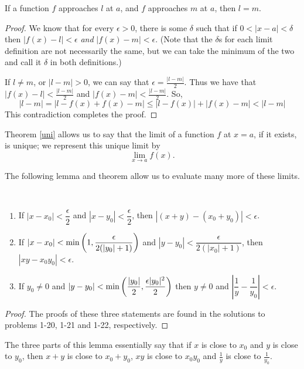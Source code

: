 \begin{theorem} \label{uni}
If a function $f$ approaches $l$ at $a$, and $f$ approaches $m$ at $a$, then $l = m$.
\begin{proof}
We know that for every $\epsilon > 0$, there is some $\delta$ such that if $0 < |x - a| < \delta$ then $|f(x) - l| < \epsilon$ \textit{and} $|f(x) - m| < \epsilon$. (Note that the $\delta$s for each limit definition are not necessarily the same, but we can take the minimum of the two and call it $\delta$ in both definitions.) 

If $l \ne m$, or $|l - m| > 0$, we can say that $\epsilon = \frac{|l - m|}{2}$. Thus we have that $|f(x) - l| < \frac{|l - m|}{2}$ and $|f(x) - m| < \frac{|l - m|}{2}$. So,
\[ |l - m| = |l - f(x) + f(x) - m| \le |l - f(x)| + |f(x) - m| < |l - m| \]
This contradiction completes the proof.
\end{proof}
\end{theorem}

Theorem \ref{uni} allows us to say that the limit of a function $f$ at $x = a$, if it exists, is unique; we represent this unique limit by 
\[ \lim_{x \to a} f(x). \]

The following lemma and theorem allow us to evaluate many more of these limits.

\begin{lemma} \ \label{limlem}
\begin{enumerate}
\item
If $|x - x_0| < \dfrac{\epsilon}{2}$ and $|x - y_0| < \dfrac{\epsilon}{2}$, then $|(x + y) - (x_0 + y_0)| < \epsilon$.
\item
If $|x - x_0| < {\rm min}\left(1, \dfrac{\epsilon}{2(|y_0| + 1)}\right)$ and $|y - y_0| < \dfrac{\epsilon}{2(|x_0| + 1)}$, then $|xy - x_0y_0| < \epsilon$.
\item
If $y_0 \ne 0$ and $|y - y_0| < {\rm min}\left(\dfrac{|y_0|}{2}, \dfrac{\epsilon|y_0|^2}{2}\right)$ then $y \ne 0$ and $\left|\dfrac{1}{y} - \dfrac{1}{y_0}\right| < \epsilon$.
\end{enumerate}
\begin{proof}
The proofs of these three statements are found in the solutions to problems 1-20, 1-21 and 1-22, respectively.
\end{proof}
\begin{remark}
The three parts of this lemma essentially say that if $x$ is close to $x_0$ and $y$ is close to $y_0$, then $x + y$ is close to $x_0 + y_0$, $xy$ is close to $x_0y_0$ and $\frac{1}{y}$ is close to $\frac{1}{y_0}$.
\end{remark}
\end{lemma}

